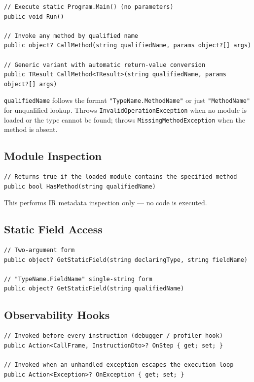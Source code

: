 \documentclass[11pt,a4paper]{article}
\newcommand{\code}[1]{\texttt{\small #1}}
\newcommand{\typename}[1]{\textcolor{typecolor}{\texttt{\small #1}}}
\begin{document}
\begin{lstlisting}[style=cs]
// Execute static Program.Main() (no parameters)
public void Run()

// Invoke any method by qualified name
public object? CallMethod(string qualifiedName, params object?[] args)

// Generic variant with automatic return-value conversion
public TResult CallMethod<TResult>(string qualifiedName, params object?[] args)
\end{lstlisting}

\code{qualifiedName} follows the format \texttt{"TypeName.MethodName"} or
just \texttt{"MethodName"} for unqualified lookup. Throws
\typename{InvalidOperationException} when no module is loaded or the type
cannot be found; throws \typename{MissingMethodException} when the method
is absent.

\subsection{Module Inspection}

\begin{lstlisting}[style=cs]
// Returns true if the loaded module contains the specified method
public bool HasMethod(string qualifiedName)
\end{lstlisting}

This performs IR metadata inspection only — no code is executed.

\subsection{Static Field Access}

\begin{lstlisting}[style=cs]
// Two-argument form
public object? GetStaticField(string declaringType, string fieldName)

// "TypeName.FieldName" single-string form
public object? GetStaticField(string qualifiedName)
\end{lstlisting}

\subsection{Observability Hooks}

\begin{lstlisting}[style=cs]
// Invoked before every instruction (debugger / profiler hook)
public Action<CallFrame, InstructionDto>? OnStep { get; set; }

// Invoked when an unhandled exception escapes the execution loop
public Action<Exception>? OnException { get; set; }
\end{lstlisting}
\end{document}
